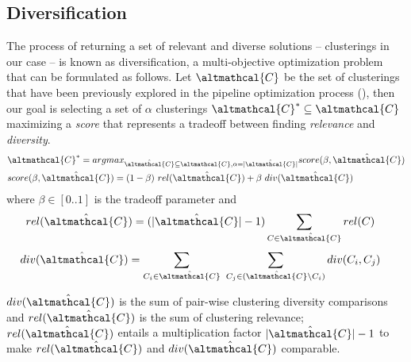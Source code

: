 \subsection{Diversification}
The process of returning a set of relevant and diverse solutions -- clusterings in our case -- is known as diversification, a multi-objective optimization problem that can be formulated as follows.
%
Let $\altmathcal{C}$ be the set of clusterings that have been previously explored in the pipeline optimization process (), then our goal is selecting a set of $\alpha$ clusterings $\altmathcal{C}^* \subseteq \altmathcal{C}$ maximizing a \textit{score} that represents a tradeoff between finding \textit{relevance} and \textit{diversity}.
%
\begin{align}\label{def:score}
&\altmathcal{C}^* = argmax_{\hat{\altmathcal{C}} \subseteq \altmathcal{C}, \alpha=|\hat{\altmathcal{C}}|} score(\beta, \hat{\altmathcal{C}})\\
&score(\beta, \hat{\altmathcal{C}}) = (1-\beta)~rel(\hat{\altmathcal{C}}) + \beta~div(\hat{\altmathcal{C}})
\end{align}
where $\beta \in [0.. 1]$ is the tradeoff parameter and
\begin{align}
rel(\hat{\altmathcal{C}}) &= (|\hat{\altmathcal{C}}|-1)\sum_{C \in \hat{\altmathcal{C}}} rel(C)
\label{def:rel}
\end{align}
\begin{align}
div(\hat{\altmathcal{C}}) &= \sum_{C_i \in \hat{\altmathcal{C}}}~\sum_{C_j \in (\hat{\altmathcal{C}} \setminus C_i)} div(C_i, C_j)
\label{def:div}
\end{align}

\noindent $div(\hat{\altmathcal{C}})$ is the sum of pair-wise clustering diversity comparisons and $rel(\hat{\altmathcal{C}})$ is the sum of clustering relevance;
$rel(\hat{\altmathcal{C}})$ entails a multiplication factor $|\hat{\altmathcal{C}}|-1$ to make $rel(\hat{\altmathcal{C}})$ and $div(\hat{\altmathcal{C}})$ comparable.




